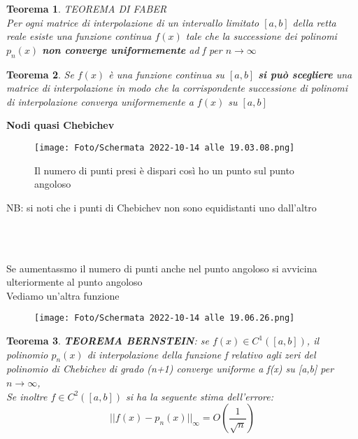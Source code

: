 \documentclass[a4paper, portrait]{book}
\numberwithin{equation}{chapter} %
\newtheorem{theorem}{Teorema}
\begin{document}
\begin{theorem}
    TEOREMA DI FABER\\
    Per ogni matrice di interpolazione di un intervallo limitato $[a,b]$ della retta reale esiste una funzione continua $f(x)$ tale che la successione dei polinomi $p_n(x)$ \textbf{non converge uniformemente} ad f per $n \rightarrow \infty$
\end{theorem}
\begin{theorem}
    Se $f(x)$ è una funzione continua su $[a,b]$ \textbf{si può scegliere} una matrice di interpolazione in modo che la corrispondente successione di polinomi di interpolazione converga uniformemente a $f(x)$ su $[a,b]$
\end{theorem}
\newpage
\textbf{Nodi quasi Chebichev}
\begin{figure}[h!]
    \centering
    \texttt{[image: Foto/Schermata 2022-10-14 alle 19.03.08.png]}
    \caption{Il numero di punti presi è dispari così ho un punto sul punto angoloso}
\end{figure}
NB: si noti che i punti di Chebichev non sono equidistanti uno dall'altro
\begin{figure}[h!]
    \centering
    \\
    \caption{}
\end{figure}
\\Se aumentassmo il numero di punti anche nel punto angoloso si avvicina ulteriormente al punto angoloso\\
Vediamo un'altra funzione
\begin{figure}
    \centering
    \texttt{[image: Foto/Schermata 2022-10-14 alle 19.06.26.png]}
    \caption{}
\end{figure}
\newpage
\begin{theorem}
    \textbf{TEOREMA BERNSTEIN}: se $f(x) \in C^1([a,b])$, il polinomio $p_n(x)$ di interpolazione della funzione f relativo agli zeri del polinomio di Chebichev di grado (n+1) converge uniforme a f(x) su [a,b] per $n\rightarrow \infty$,\\
    Se inoltre $f \in C^2([a,b])$ si ha la seguente stima dell'errore:
    \begin{equation}
        ||f(x) - p_n(x)||_{\infty} = O\left(\frac{1}{\sqrt{n}}\right)
    \end{equation}
\end{theorem}
\end{document}
